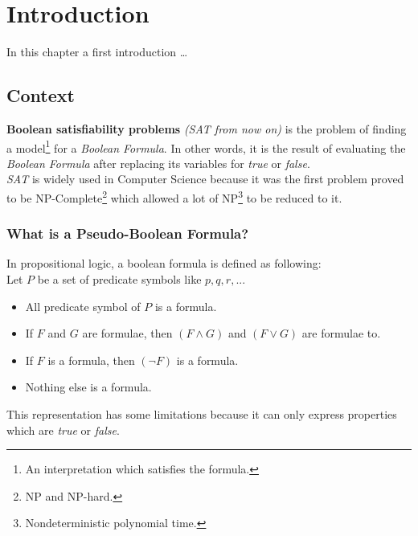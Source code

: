 \chapter{Introduction} %

\label{Chapter1} %

In this chapter a first introduction \ldots

\section{Context}

\textbf{Boolean satisfiability problems} \textit{(SAT from now on)} is the problem of finding a model\footnote{An interpretation which satisfies the formula.} for a \emph{Boolean Formula}. In other words, it is the result of evaluating the \emph{Boolean Formula} after replacing its variables for \emph{true} or \emph{false}. 
\\
\emph{SAT} is widely used in Computer Science because it was the first problem proved to be NP-Complete\cite{Cook1971}\footnote{NP and NP-hard.} which allowed a lot of NP\footnote{Nondeterministic polynomial time.} to be reduced to it.

\subsection{What is a Pseudo-Boolean Formula?}
In propositional logic, a boolean formula is defined as following\cite{Lpo}:\\
Let $P$ be a set of predicate symbols like $p,q,r,...$
\begin{itemize}
	\item All predicate symbol of $P$ is a formula.
	\item If $F$ and $G$ are formulae, then $(F \land G)$ and $(F \lor G)$ are formulae to.
	\item If $F$ is a formula, then $(\neg F)$ is a formula.
	\item Nothing else is a formula.
\end{itemize}
This representation has some limitations because it can only express properties which are \emph{true} or \emph{false}.\\


